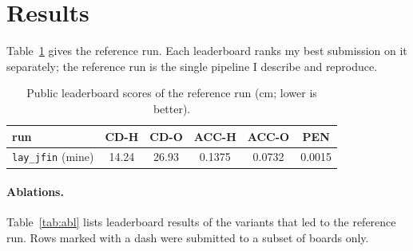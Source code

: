 \documentclass[10pt,twocolumn]{article}
\begin{document}
\section{Results}
Table~\ref{tab:main} gives the reference run. Each leaderboard ranks my best submission on it separately; the
reference run is the single pipeline I describe and reproduce.

\begin{table}[t]
\centering\small
\setlength{\tabcolsep}{3pt}
\begin{tabular}{lccccc}
\toprule
run & CD-H & CD-O & ACC-H & ACC-O & PEN \\
\midrule
\texttt{lay\_jfin} (mine) & 14.24 & 26.93 & 0.1375 & 0.0732 & 0.0015 \\
\bottomrule
\end{tabular}
\caption{Public leaderboard scores of the reference run (cm; lower is better).}
\label{tab:main}
\end{table}

\paragraph{Ablations.} Table~\ref{tab:abl} lists leaderboard results of the variants that led to the reference
run. Rows marked with a dash were submitted to a subset of boards only.
\end{document}
